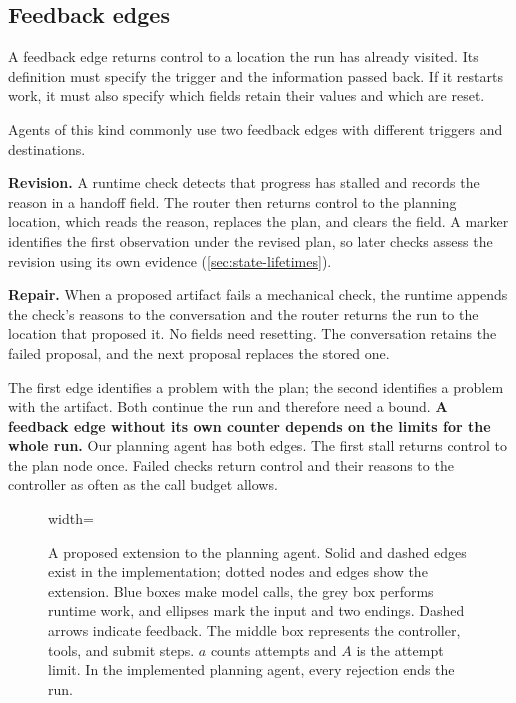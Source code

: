 \subsection{Feedback edges}
\label{sec:control-backedges}

A feedback edge returns control to a location the run has already visited. Its definition must
specify the trigger and the information passed back. If it restarts work, it must also specify
which fields retain their values and which are reset.

Agents of this kind commonly use two feedback edges with different triggers and destinations.

\bi

\item \textbf{Revision.} A runtime check detects that progress has stalled and records the
reason in a handoff field. The router then returns control to the planning location, which reads
the reason, replaces the plan, and clears the field. A marker identifies the first observation
under the revised plan, so later checks assess the revision using its own evidence
(\cref{sec:state-lifetimes}).

\item \textbf{Repair.} When a proposed artifact fails a mechanical check, the runtime appends the
check's reasons to the conversation and the router returns the run to the location that proposed
it. No fields need resetting. The conversation retains the failed proposal, and the next proposal
replaces the stored one.

\ei

The first edge identifies a problem with the plan; the second identifies a problem with the
artifact. Both continue the run and therefore need a bound. \textbf{A feedback edge without its own
counter depends on the limits for the whole run.} Our planning agent has both edges. The first stall
returns control to the plan node once. Failed checks return control and their reasons to the
controller as often as the call budget allows.

\begin{figure}[htbp]
  \centering
  \begin{adjustbox}{width=\linewidth}\end{adjustbox}
  \caption{A proposed extension to the planning agent. Solid and dashed edges exist in the implementation;
  dotted nodes and edges show the extension. Blue boxes make model calls, the grey box performs
  runtime work, and ellipses mark the input and two endings. Dashed arrows indicate feedback.
  The middle box represents the controller, tools, and submit steps. $a$ counts attempts and $A$
  is the attempt limit. In the implemented planning agent, every rejection ends the run.}
  \label{fig:control-extension}
\end{figure}

